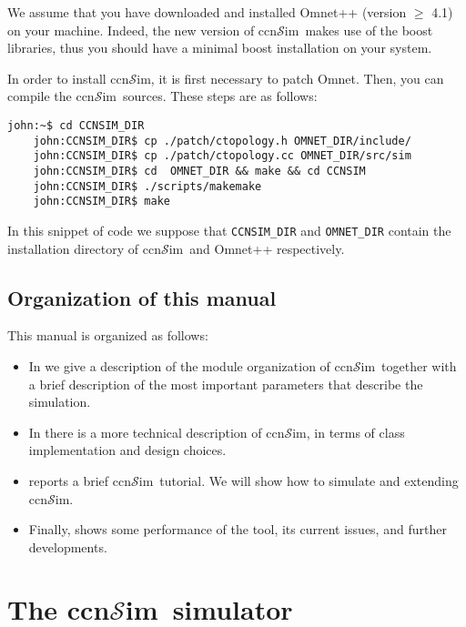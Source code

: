 \documentclass{book}
\newcommand{\ccnsim}{ccn$\mathcal{S}$im}
\begin{document}
We assume that you have downloaded and installed Omnet++ (version $\geq$ 4.1) on your machine. Indeed, the new version of \ccnsim\ makes use of the boost libraries, thus you should have a minimal boost installation on your system. 

In order to install \ccnsim, it is first necessary to patch Omnet. Then, you can compile the \ccnsim\ sources. These steps are as follows:

\begin{Verbatim}[frame=single]
    john:~$ cd CCNSIM_DIR
    john:CCNSIM_DIR$ cp ./patch/ctopology.h OMNET_DIR/include/
    john:CCNSIM_DIR$ cp ./patch/ctopology.cc OMNET_DIR/src/sim
    john:CCNSIM_DIR$ cd  OMNET_DIR && make && cd CCNSIM
    john:CCNSIM_DIR$ ./scripts/makemake
    john:CCNSIM_DIR$ make
\end{Verbatim}
In this snippet of code we suppose that \verb|CCNSIM_DIR| and \verb|OMNET_DIR| contain the installation directory of \ccnsim\ and Omnet++ respectively. 
\section{Organization of this manual}
This manual is organized as follows:
\begin{itemize}
    \item  In   we give a description of the module organization of \ccnsim\ together with a brief description of the most important parameters that describe the simulation.
    \item In   there is a more technical description of \ccnsim, in terms of class implementation and design choices. 
    \item {} reports a brief \ccnsim\ tutorial. We will show how to simulate and extending \ccnsim. 
    \item Finally,  shows some performance of the tool, its current issues, and further developments.
\end{itemize}


\chapter{The \ccnsim\ simulator}\label{ch:details}
\end{document}
